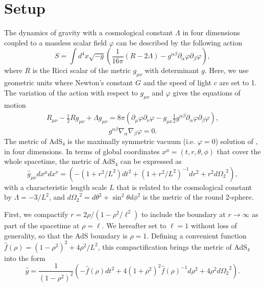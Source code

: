 \documentclass[12pt]{iopart}
\begin{document}
\section{Setup}\label{sec:setup}

The dynamics of gravity with a cosmological constant $\Lambda$ in four dimensions coupled to a massless scalar field $\varphi$ can be described by the following action
\begin{equation}\label{eqn:action}
S = \int d^4 x \sqrt{-g} \left( \frac{1}{16\pi} \left( R - 2\Lambda \right) - g^{\alpha\beta} \partial_\alpha \varphi \partial_\beta \varphi \right),
\end{equation}
where $R$ is the Ricci scalar of the metric $g_{\mu\nu}$ with determinant $g$.
Here, we use geometric units where Newton's constant $G$ and the speed of light $c$ are set to 1.
The variation of the action  with respect to $g_{\mu\nu}$ and $\varphi$ gives the equations of motion
\begin{eqnarray}\label{eqn:eoms1}
R_{\mu\nu} - \frac{1}{2} R g_{\mu\nu} + \Lambda g_{\mu\nu} = 8\pi \left( \partial_\mu \varphi \partial_\nu \varphi - g_{\mu\nu} \frac{1}{2} g^{\alpha\beta} \partial_{\alpha} \varphi \partial_{\beta} \varphi \right),
\end{eqnarray}
\begin{equation}\label{eqn:eoms2}
g^{\alpha\beta} \nabla_{\alpha} \nabla_{\beta} \varphi = 0.
\end{equation}
The metric of AdS$_4$ is the maximally symmetric vacuum (i.e. $\varphi=0$) solution of , in four dimensions.
In terms of global coordinates $x^\mu=(t,r,\theta,\phi)$ that cover the whole spacetime, the metric of AdS$_4$ can be expressed as
\begin{equation}\label{eqn:ads4}
\hat{g}_{\mu\nu} dx^\mu dx^\nu = \left( -(1+r^2/L^2) dt^2 + (1+r^2/L^2)^{-1} dr^2 +r^2 d{\Omega_2}^2 \right), \nonumber
\end{equation}
with a characteristic length scale $L$ that is related to the cosmological constant by $\Lambda = - 3/L^2$, and $d{\Omega_2}^2 = d\theta^2 + \sin^2\theta d\phi^2$ is the metric of the round 2-sphere.

First, we compactify $r=2\rho/(1-\rho^2/\ell^2)$ to include the boundary at $r \rightarrow \infty$ as part of the spacetime at $\rho=\ell$.
We hereafter set to $\ell=1$ without loss of generality, so that the AdS boundary is $\rho=1$.
Defining a convenient function $\hat{f}(\rho) = (1-\rho^2)^2+4\rho^2/L^2$, this compactification brings the metric of AdS$_4$ into the form
\begin{equation}\label{eqn:ads4_compact}
\hat{g} = \frac{1}{(1-\rho^2)^2} \left( -\hat{f}(\rho) dt^2 + 4(1+\rho^2)^2 \hat{f}(\rho)^{-1} d\rho^2 + 4\rho^2 d{\Omega_2}^2 \right). \nonumber
\end{equation}
\end{document}
